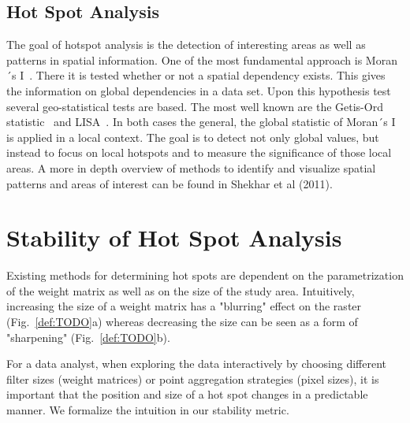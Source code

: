 \documentclass{itatnew}
\begin{document}
\subsection{Hot Spot Analysis}
The goal of hotspot analysis is the detection of interesting areas as well as patterns in spatial information. One of the most fundamental approach is Moran´s I~\cite{MoranI}. There it is tested whether or
not a spatial dependency exists. This gives the information on global
dependencies in a data set. Upon this hypothesis test several geo-statistical
tests are based. The most well known are the Getis-Ord statistic~\cite{Ord.1995}
and LISA~\cite{Anselin.1995}. In both cases the general, the global statistic of
Moran´s I is applied in a local context. The goal is to detect not only global
values, but instead to focus on local hotspots and to measure the significance
of those local areas. A more in depth overview of methods to identify and visualize spatial patterns and areas of interest can be found in Shekhar et al (2011). 

\section{Stability of Hot Spot Analysis}
\label{sec:Metric}

Existing methods for determining hot spots are dependent on the parametrization
of the weight matrix as well as on the size of the study area. Intuitively,
increasing the size of a weight matrix has a "blurring" effect on the raster
(Fig.~\ref{def:TODO}a) whereas decreasing the size can be seen as a form of
"sharpening" (Fig.~\ref{def:TODO}b).



For a data analyst, when exploring the data interactively by choosing different
filter sizes (weight matrices) or point aggregation strategies (pixel sizes), it
is important that the position and size of a hot spot changes in a predictable
manner. We formalize the intuition in our stability metric.

%
%
%  
\end{document}
